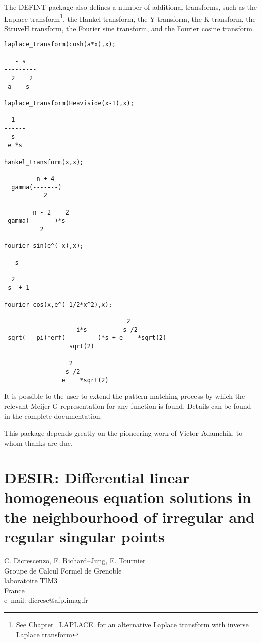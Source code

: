 \documentclass[11pt,letterpaper]{book}
\begin{document}
The DEFINT package also defines a number of additional transforms,
such as the Laplace transform\footnote{See
Chapter~\ref{LAPLACE} for an alternative Laplace transform with
inverse Laplace transform}, the Hankel
transform, the Y-transform,
the K-transform, the StruveH
transform, the Fourier sine
transform, and the Fourier cosine
transform.

{\small\begin{verbatim}
laplace_transform(cosh(a*x),x);

   - s
---------
  2    2
 a  - s

laplace_transform(Heaviside(x-1),x);

  1
------
  s
 e *s

hankel_transform(x,x);

         n + 4
  gamma(-------)
           2
-------------------
        n - 2    2
 gamma(-------)*s
          2

fourier_sin(e^(-x),x);

   s
--------
  2
 s  + 1

fourier_cos(x,e^(-1/2*x^2),x);

                                  2
                    i*s          s /2
 sqrt( - pi)*erf(---------)*s + e    *sqrt(2)
                  sqrt(2)
----------------------------------------------
                  2
                 s /2
                e    *sqrt(2)

\end{verbatim}}

It is possible to the user to extend the pattern-matching process by
which the relevant Meijer G representation for any function is found.
Details can be found in the complete documentation.

This package depends greatly on the pioneering work of Victor
Adamchik, to whom thanks are due.

\chapter[DESIR: Linear Homogeneous DEs]%
        {DESIR: Differential linear homogeneous equation solutions in the
                neighbourhood of irregular and regular singular points}
\label{DESIR}

{\footnotesize
\begin{center}
C. Dicrescenzo, F. Richard--Jung, E. Tournier \\
Groupe de Calcul Formel de Grenoble \\
laboratoire TIM3 \\
France \\[0.05in]
e--mail: dicresc@afp.imag.fr
\end{center}
}
\end{document}
